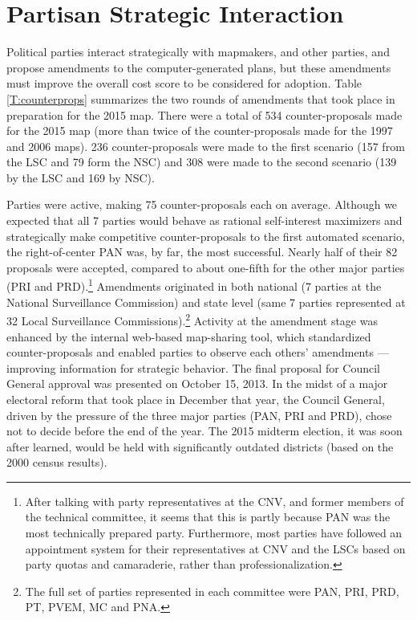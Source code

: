 \documentclass[letter,12pt]{article}
\begin{document}
\section{Partisan Strategic Interaction}

Political parties interact strategically with mapmakers, and other parties, and propose amendments to the computer-generated plans, but these amendments must improve the overall cost score to be considered for adoption. Table \ref{T:counterprops} summarizes the two rounds of amendments that took place in preparation for the 2015 map. There were a total of 534 counter-proposals made for the 2015 map (more than twice of the counter-proposals made for the 1997 and 2006 maps). 236 counter-proposals were made to the first scenario (157 from the LSC and 79 form the NSC) and 308 were made to the second scenario (139 by the LSC and 169 by NSC).

Parties were active, making 75 counter-proposals each on average. Although we expected that all 7 parties would behave as rational self-interest maximizers and strategically make competitive counter-proposals to the first automated scenario, the right-of-center PAN was, by far, the most successful. Nearly half of their 82 proposals were accepted, compared to about one-fifth for the other major parties (PRI and PRD).\footnote{After talking with party representatives at the CNV, and former members of the technical committee, it seems that this is partly because PAN was the most technically prepared party. Furthermore, most parties have followed an appointment system for their representatives at CNV and the LSCs based on party quotas and camaraderie, rather than professionalization.} Amendments originated in both national (7 parties at the National Surveillance Commission) and state level (same 7 parties represented at 32 Local Surveillance Commissions).\footnote{The full set of parties represented in each committee were PAN, PRI, PRD, PT, PVEM, MC and PNA.} Activity at the amendment stage was enhanced by the internal web-based map-sharing tool, which standardized counter-proposals and enabled parties to observe each others' amendments --- improving information for strategic behavior. The final proposal for Council General approval was presented on October 15, 2013. In the midst of a major electoral reform that took place in December that year, the Council General, driven by the pressure of the three major parties (PAN, PRI and PRD), chose not to decide before the end of the year. The 2015 midterm election, it was soon after learned, would be held with significantly outdated districts (based on the 2000 census results). 
\end{document}
